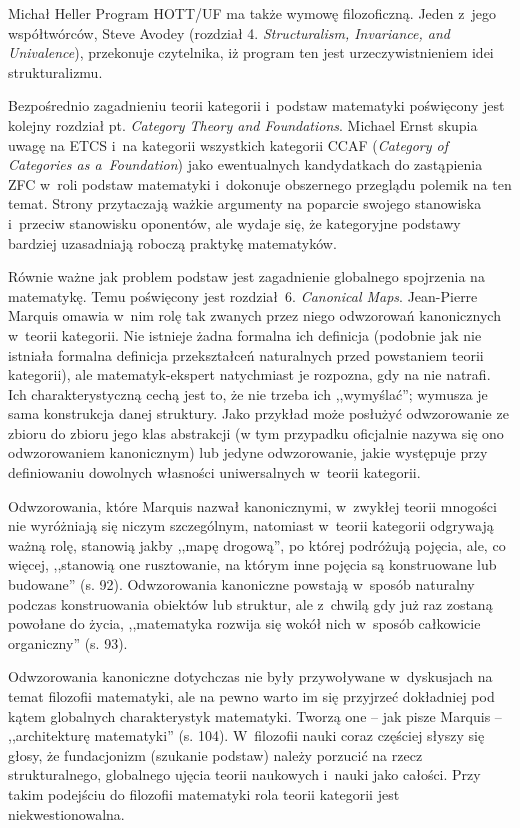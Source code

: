 \begin{recplenv}{Michał Heller}
Program HOTT/UF ma także wymowę filozoficzną. Jeden z~jego współtwórców, Steve Avodey (rozdział 4. \textit{Structuralism, Invariance, and Univalence}), przekonuje czytelnika, iż program ten jest urzeczywistnieniem idei strukturalizmu.

Bezpośrednio zagadnieniu teorii kategorii i~podstaw matematyki poświęcony jest kolejny rozdział pt. \textit{Category Theory and Foundations}. Michael Ernst skupia uwagę na ETCS i~na kategorii wszystkich kategorii CCAF (\textit{Category of Categories as a~Foundation}) jako ewentualnych kandydatkach do zastąpienia ZFC w~roli podstaw matematyki i~dokonuje obszernego przeglądu polemik na ten temat. Strony przytaczają ważkie argumenty na poparcie swojego stanowiska i~przeciw stanowisku oponentów, ale wydaje się, że kategoryjne podstawy bardziej uzasadniają roboczą praktykę matematyków.

Równie ważne jak problem podstaw jest zagadnienie globalnego spojrzenia na matematykę. Temu poświęcony jest rozdział~6. \textit{Canonical Maps}. Jean-Pierre Mar\-quis omawia w~nim rolę tak zwanych przez niego odwzorowań kanonicznych w~teorii kategorii. Nie istnieje żadna formalna ich definicja (podobnie jak nie istniała formalna definicja przekształceń naturalnych przed powstaniem teorii kategorii), ale matematyk-ekspert natychmiast je rozpozna, gdy na nie natrafi. Ich charakterystyczną cechą jest to, że nie trzeba ich ,,wymyślać''; wymusza je sama konstrukcja danej struktury. Jako przykład może posłużyć odwzorowanie ze zbioru do zbioru jego klas abstrakcji (w tym przypadku oficjalnie nazywa się ono odwzorowaniem kanonicznym) lub jedyne odwzorowanie, jakie występuje  przy definiowaniu dowolnych własności uniwersalnych w~teorii kategorii.

Odwzorowania, które Marquis nazwał kanonicznymi, w~zwykłej teorii mnogości nie wyróżniają się niczym szczególnym, natomiast w~teorii kategorii odgrywają ważną rolę, stanowią jakby ,,mapę drogową'', po której podróżują pojęcia, ale, co więcej, ,,stanowią one rusztowanie, na którym inne pojęcia są konstruowane lub budowane'' (s. 92). Odwzorowania kanoniczne powstają w~sposób naturalny podczas konstruowania obiektów lub struktur, ale z~chwilą gdy już raz zostaną powołane do życia, ,,matematyka rozwija się wokół nich w~sposób całkowicie organiczny'' (s. 93).

Odwzorowania kanoniczne dotychczas nie były przywoływane w~dyskusjach na temat filozofii matematyki, ale na pewno warto im się przyjrzeć dokładniej pod kątem globalnych charakterystyk matematyki. Tworzą one -- jak pisze Mar\-quis -- ,,architekturę matematyki'' (s. 104). W~filozofii nauki coraz częściej słyszy się głosy, że fundacjonizm (szukanie podstaw) należy porzucić na rzecz strukturalnego, globalnego ujęcia teorii naukowych i~nauki jako całości. Przy takim podejściu do filozofii matematyki rola teorii kategorii jest niekwestionowalna.


\end{recplenv}
